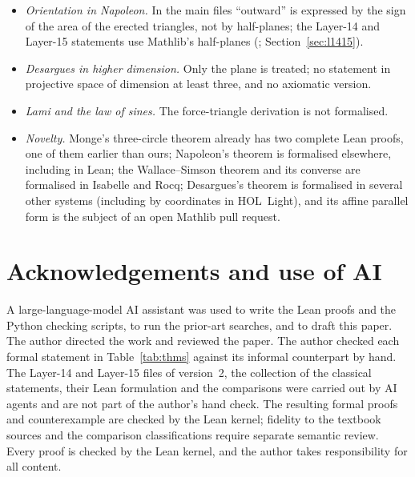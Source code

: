 \documentclass[11pt]{article}
\theoremstyle{definition}
\theoremstyle{remark}
\begin{document}
\begin{itemize}
non-isotropic side vectors, has not been attempted.
\item \emph{Orientation in Napoleon.} In the main files ``outward'' is expressed by the sign of the area of the
erected triangles, not by half-planes; the Layer-14 and Layer-15 statements use Mathlib's
half-planes (; Section~\ref{sec:l1415}).
\item \emph{Desargues in higher dimension.} Only the plane is treated; no statement in projective
space of dimension at least three, and no axiomatic version.
\item \emph{Lami and the law of sines.} The force-triangle derivation is not formalised.
\item \emph{Novelty.} Monge's three-circle theorem already has two complete Lean proofs, one of
them earlier than ours; Napoleon's theorem is formalised elsewhere, including in Lean; the
Wallace--Simson theorem and its converse are formalised in Isabelle and Rocq; Desargues's theorem
is formalised in several other systems (including by coordinates in HOL~Light), and its affine
parallel form is the subject of an open Mathlib pull request.
\end{itemize}

\section*{Acknowledgements and use of AI}
A large-language-model AI assistant was used to write the Lean proofs and the Python checking
scripts, to run the prior-art searches, and to draft this paper. The author directed the work and
reviewed the paper. The author checked each formal statement in Table~\ref{tab:thms} against its
informal counterpart by hand. The Layer-14 and Layer-15 files of version~2, the collection of the
classical statements, their Lean formulation and the comparisons were carried out by AI agents and
are not part of the author's hand check. The resulting
formal proofs and counterexample are checked by the Lean kernel; fidelity to the textbook sources
and the comparison classifications require separate semantic review.
Every proof is checked by the Lean kernel, and the author takes responsibility for all content.
\end{document}
